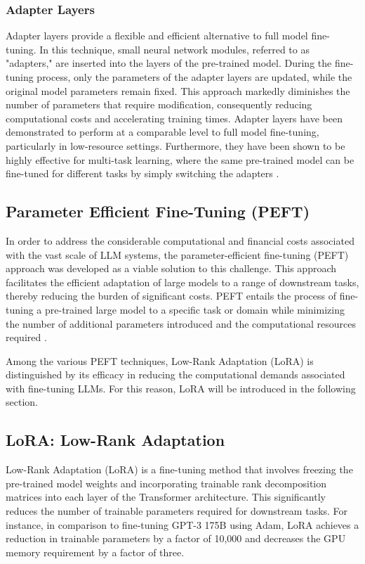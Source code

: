 \subsubsection{Adapter Layers}

Adapter layers provide a flexible and efficient alternative to full model fine-tuning. In this technique, small neural network modules, referred to as "adapters," are inserted into the layers of the pre-trained model. During the fine-tuning process, only the parameters of the adapter layers are updated, while the original model parameters remain fixed. This approach markedly diminishes the number of parameters that require modification, consequently reducing computational costs and accelerating training times. Adapter layers have been demonstrated to perform at a comparable level to full model fine-tuning, particularly in low-resource settings. Furthermore, they have been shown to be highly effective for multi-task learning, where the same pre-trained model can be fine-tuned for different tasks by simply switching the adapters \cite{houlsby2019parameter}.

\subsection{Parameter Efficient Fine-Tuning (PEFT)}

In order to address the considerable computational and financial costs associated with the vast scale of LLM systems, the parameter-efficient fine-tuning (PEFT) approach was developed as a viable solution to this challenge. This approach facilitates the efficient adaptation of large models to a range of downstream tasks, thereby reducing the burden of significant costs. PEFT entails the process of fine-tuning a pre-trained large model to a specific task or domain while minimizing the number of additional parameters introduced and the computational resources required \cite{han2024parameter}.

Among the various PEFT techniques, Low-Rank Adaptation (LoRA) is distinguished by its efficacy in reducing the computational demands associated with fine-tuning LLMs. For this reason, LoRA will be introduced in the following section.

\subsection{LoRA: Low-Rank Adaptation}

Low-Rank Adaptation (LoRA) is a fine-tuning method that involves freezing the pre-trained model weights and incorporating trainable rank decomposition matrices into each layer of the Transformer architecture. This significantly reduces the number of trainable parameters required for downstream tasks. For instance, in comparison to fine-tuning GPT-3 175B using Adam, LoRA achieves a reduction in trainable parameters by a factor of 10,000 and decreases the GPU memory requirement by a factor of three.

